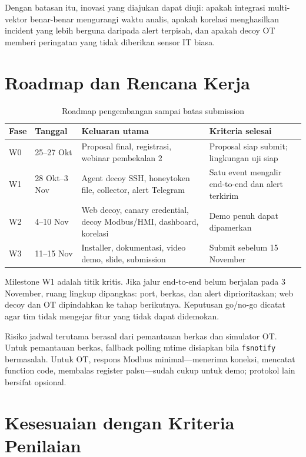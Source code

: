 \documentclass[12pt,a4paper]{article}
\begin{document}
Dengan batasan itu, inovasi yang diajukan dapat diuji: apakah integrasi multi-vektor benar-benar mengurangi waktu analis, apakah korelasi menghasilkan incident yang lebih berguna daripada alert terpisah, dan apakah decoy OT memberi peringatan yang tidak diberikan sensor IT biasa.

\section{Roadmap dan Rencana Kerja}

\begin{table}[htbp]
\centering
\caption{Roadmap pengembangan sampai batas submission}
\label{tab:roadmap}
\footnotesize
\begin{tabularx}{\textwidth}{@{}l l X X@{}}
\toprule
\textbf{Fase} & \textbf{Tanggal} & \textbf{Keluaran utama} & \textbf{Kriteria selesai} \\
\midrule
W0 & 25--27 Okt & Proposal final, registrasi, webinar pembekalan 2 & Proposal siap submit; lingkungan uji siap \\
W1 & 28 Okt--3 Nov & Agent decoy SSH, honeytoken file, collector, alert Telegram & Satu event mengalir end-to-end dan alert terkirim \\
W2 & 4--10 Nov & Web decoy, canary credential, decoy Modbus/HMI, dashboard, korelasi & Demo penuh dapat dipamerkan \\
W3 & 11--15 Nov & Installer, dokumentasi, video demo, slide, submission & Submit sebelum 15 November \\
\bottomrule
\end{tabularx}
\end{table}

Milestone W1 adalah titik kritis. Jika jalur end-to-end belum berjalan pada 3 November, ruang lingkup dipangkas: port, berkas, dan alert diprioritaskan; web decoy dan OT dipindahkan ke tahap berikutnya. Keputusan go/no-go dicatat agar tim tidak mengejar fitur yang tidak dapat didemokan.

Risiko jadwal terutama berasal dari pemantauan berkas dan simulator OT. Untuk pemantauan berkas, fallback polling mtime disiapkan bila \texttt{fsnotify} bermasalah. Untuk OT, respons Modbus minimal---menerima koneksi, mencatat function code, membalas register palsu---sudah cukup untuk demo; protokol lain bersifat opsional.

\section{Kesesuaian dengan Kriteria Penilaian}
\end{document}
